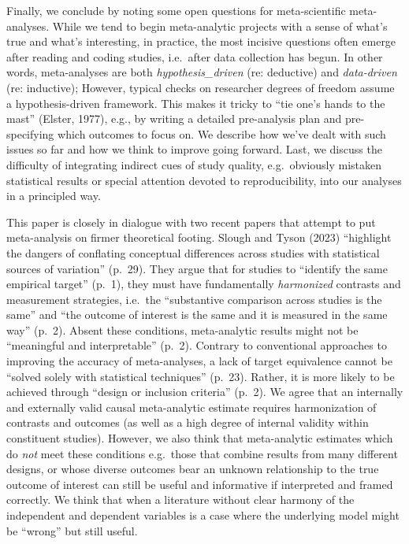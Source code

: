 \documentclass[
  man]{apa6}
\begin{document}
Finally, we conclude by noting some open questions for meta-scientific meta-analyses. While we tend to begin meta-analytic projects with a sense of what's true and what's interesting, in practice, the most incisive questions often emerge after reading and coding studies, i.e.~after data collection has begun. In other words, meta-analyses are both \emph{hypothesis\_driven} (re: deductive) and \emph{data-driven} (re: inductive); However, typical checks on researcher degrees of freedom assume a hypothesis-driven framework. This makes it tricky to ``tie one's hands to the mast'' (Elster, 1977), e.g., by writing a detailed pre-analysis plan and pre-specifying which outcomes to focus on. We describe how we've dealt with such issues so far and how we think to improve going forward. Last, we discuss the difficulty of integrating indirect cues of study quality, e.g.~obviously mistaken statistical results or special attention devoted to reproducibility, into our analyses in a principled way.

This paper is closely in dialogue with two recent papers that attempt to put meta-analysis on firmer theoretical footing. Slough and Tyson (2023) ``highlight the dangers of conflating conceptual differences across studies with statistical sources of variation'' (p.~29). They argue that for studies to ``identify the same empirical target'' (p.~1), they must have fundamentally \emph{harmonized} contrasts and measurement strategies, i.e.~the ``substantive comparison across studies is the same'' and ``the outcome of interest is the same and it is measured in the same way'' (p.~2). Absent these conditions, meta-analytic results might not be ``meaningful and interpretable'' (p.~2). Contrary to conventional approaches to improving the accuracy of meta-analyses, a lack of target equivalence cannot be ``solved solely with statistical techniques'' (p.~23). Rather, it is more likely to be achieved through ``design or inclusion criteria'' (p.~2). We agree that an internally and externally valid causal meta-analytic estimate requires harmonization of contrasts and outcomes (as well as a high degree of internal validity within constituent studies). However, we also think that meta-analytic estimates which do \emph{not} meet these conditions \textemdash e.g.~those that combine results from many different designs, or whose diverse outcomes bear an unknown relationship to the true outcome of interest \textemdash can still be useful and informative if interpreted and framed correctly. We think that when a literature without clear harmony of the independent and dependent variables is a case where the underlying model might be ``wrong'' but still useful.
\end{document}
